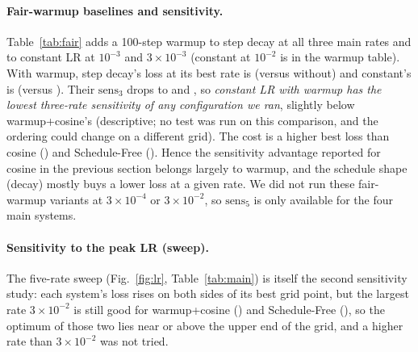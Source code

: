 \begin{table}[t]\centering\caption{Step decay and constant LR with a 100-step warmup at the three main rates (constant at $10^{-2}$ is in Table~\ref{tab:warm}).}\label{tab:fair}
\resizebox{\columnwidth}{!}{}\end{table}

\paragraph{Fair-warmup baselines and sensitivity.} Table~\ref{tab:fair} adds a 100-step warmup to step decay at all three main rates and to constant LR at $10^{-3}$ and $3\times10^{-3}$ (constant at $10^{-2}$ is in the warmup table). With warmup, step decay's loss at its best rate is  (versus  without) and constant's is  (versus ). Their $\text{sens}_3$ drops to  and , so \emph{constant LR with warmup has the lowest three-rate sensitivity of any configuration we ran}, slightly below warmup+cosine's  (descriptive; no test was run on this comparison, and the ordering could change on a different grid). The cost is a higher best loss than cosine () and Schedule-Free (). Hence the sensitivity advantage reported for cosine in the previous section belongs largely to warmup, and the schedule shape (decay) mostly buys a lower loss at a given rate. We did not run these fair-warmup variants at $3\times10^{-4}$ or $3\times10^{-2}$, so $\text{sens}_5$ is only available for the four main systems.

\paragraph{Sensitivity to the peak LR (sweep).} The five-rate sweep (Fig.~\ref{fig:lr}, Table~\ref{tab:main}) is itself the second sensitivity study: each system's loss rises on both sides of its best grid point, but the largest rate $3\times10^{-2}$ is still good for warmup+cosine () and Schedule-Free (), so the optimum of those two lies near or above the upper end of the grid, and a higher rate than $3\times10^{-2}$ was not tried.
